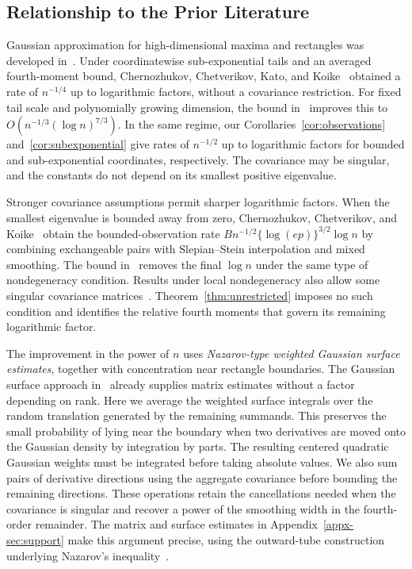 \documentclass[11pt,letterpaper]{article}
\theoremstyle{remark}
\begin{document}
\subsection{Relationship to the Prior Literature}\label{sec:literature}

Gaussian approximation for high-dimensional maxima and rectangles was
developed in~\cite{CCK2013,CCK2017}. Under coordinatewise sub-exponential
tails and an averaged fourth-moment bound, Chernozhukov, Chetverikov,
Kato, and Koike~\cite[Theorem~2.1]{CCKK2022} obtained a rate of
\(n^{-1/4}\) up to logarithmic factors, without a covariance restriction.
For fixed tail scale and polynomially growing dimension, the bound
in~\cite[Theorem~1]{GaoZhang} improves this to
\(O(n^{-1/3}(\log n)^{7/3})\).
In the same regime, our Corollaries~\ref{cor:observations}
and~\ref{cor:subexponential} give rates of \(n^{-1/2}\) up to logarithmic
factors for bounded and sub-exponential coordinates, respectively.
The covariance may be singular, and the constants do not depend on its
smallest positive eigenvalue.

Stronger covariance assumptions permit sharper logarithmic factors.
When the smallest eigenvalue is bounded away from zero,
Chernozhukov, Chetverikov, and Koike~\cite{CCK} obtain the bounded-observation
rate \(Bn^{-1/2}\{\log(ep)\}^{3/2}\log n\) by combining exchangeable
pairs with Slepian--Stein interpolation and mixed smoothing.
The bound in~\cite{AL} removes the final \(\log n\) under the same
type of nondegeneracy condition. Results under local nondegeneracy
also allow some singular covariance matrices~\cite{FKLZ,Local}.
Theorem~\ref{thm:unrestricted} imposes no such condition and identifies
the relative fourth moments that govern its remaining logarithmic factor.

The improvement in the power of \(n\) uses
\emph{Nazarov-type weighted Gaussian surface estimates}, together with
concentration near rectangle boundaries. The Gaussian surface approach
in~\cite{GaoZhang} already supplies matrix estimates without a factor
depending on rank. Here we average the weighted surface integrals over
the random translation generated by the remaining summands.
This preserves the small probability of lying near the boundary when
two derivatives are moved onto the Gaussian density by integration by
parts. The resulting centered quadratic Gaussian weights must be
integrated before taking absolute values. We also sum pairs of
derivative directions using the aggregate covariance before bounding
the remaining directions. These operations retain the cancellations
needed when the covariance is singular and recover a power of the
smoothing width in the fourth-order remainder. The matrix and surface
estimates in Appendix~\ref{appx-sec:support} make this argument precise,
using the outward-tube construction underlying Nazarov's
inequality~\cite{Nazarov2003,CCK17N}.
\end{document}
